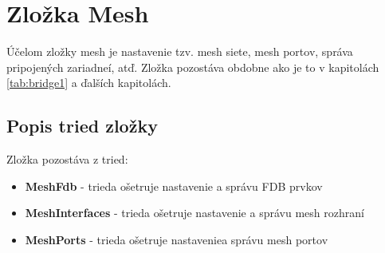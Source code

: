 \section{Zložka Mesh}
Účelom zložky mesh je nastavenie tzv. mesh siete, mesh portov, správa pripojených zariadneí, atď. Zložka pozostáva obdobne ako je to v kapitolách \ref{tab:bridge1} a ďalších kapitolách.
\subsection{Popis tried zložky}
Zložka pozostáva z tried:
\begin{itemize}
\item \textbf{MeshFdb} - trieda ošetruje nastavenie a správu FDB prvkov
\item \textbf{MeshInterfaces} - trieda ošetruje nastavenie a správu mesh rozhraní
\item \textbf{MeshPorts} - trieda ošetruje nastaveniea správu mesh portov
\end{itemize}
